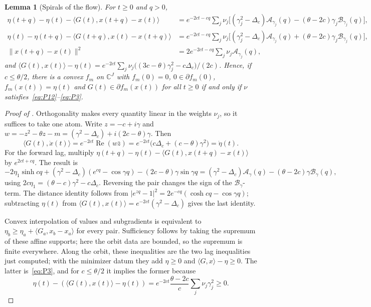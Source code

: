 \documentclass[11pt]{article}
\newtheorem{lemma}[theorem]{Lemma}
\theoremstyle{definition}
\theoremstyle{remark}
\newcommand{\C}{\mathbb C}
\newcommand{\cA}{\mathcal A}
\newcommand{\cB}{\mathcal B}
\newcommand{\ch}{\cosh}
\newcommand{\sh}{\sinh}
\newcommand{\Rea}{\operatorname{Re}}
\newcommand{\ip}[2]{\langle #1,#2\rangle}
\newcommand{\norm}[1]{\lVert #1\rVert}
\begin{document}
\begin{lemma}[Spirals of the flow]\label{lem:creduce}
For \(t\ge0\) and \(q>0\),
\begin{align*}
\eta(t+q)-\eta(t)-\ip{G(t)}{x(t+q)-x(t)}&=e^{-2ct-cq}\textstyle\sum_j\nu_j\bigl[(\gamma_j^2-\Delta_c)\cA_{\gamma_j}(q)-(\theta-2c)\gamma_j\cB_{\gamma_j}(q)\bigr],\\
\eta(t)-\eta(t+q)-\ip{G(t+q)}{x(t)-x(t+q)}&=e^{-2ct-cq}\textstyle\sum_j\nu_j\bigl[(\gamma_j^2-\Delta_c)\cA_{\gamma_j}(q)+(\theta-2c)\gamma_j\cB_{\gamma_j}(q)\bigr],\\
\norm{x(t+q)-x(t)}^2&=2e^{-2ct-cq}\textstyle\sum_j\nu_j\cA_{\gamma_j}(q),
\end{align*}
and \(\ip{G(t)}{x(t)}-\eta(t)=e^{-2ct}\sum_j\nu_j\bigl((3c-\theta)\gamma_j^2-c\Delta_c\bigr)/(2c)\).  Hence, if
\(c\le\theta/2\), there is a convex \(f_m\) on \(\C^J\) with \(f_m(0)=0\), \(0\in\partial f_m(0)\), \(f_m(x(t))=\eta(t)\) and
\(G(t)\in\partial f_m(x(t))\) for all \(t\ge0\) if and only if \(\nu\) satisfies~\eqref{eq:P12}--\eqref{eq:P3}.
\end{lemma}

\begin{proof}[Proof of ]
Orthogonality makes every quantity linear in the weights \(\nu_j\),
so it suffices to take one atom.  Write
\(z=-c+i\gamma\) and
\(w=-z^2-\theta z-m=(\gamma^2-\Delta_c)+i(2c-\theta)\gamma\).
Then
\[
\ip{G(t)}{\dot x(t)}
=e^{-2ct}\Rea(w\bar z)
=e^{-2ct}\bigl(c\Delta_c+(c-\theta)\gamma^2\bigr)=\dot\eta(t).
\]
For the forward lag, multiply
\(\eta(t+q)-\eta(t)-\ip{G(t)}{x(t+q)-x(t)}\)
by \(e^{2ct+cq}\).  The result is
\[
-2\eta_1\sh cq+(\gamma^2-\Delta_c)(e^{cq}-\cos\gamma q)
-(2c-\theta)\gamma\sin\gamma q
=(\gamma^2-\Delta_c)\cA_\gamma(q)
-(\theta-2c)\gamma\cB_\gamma(q),
\]
using \(2c\eta_1=(\theta-c)\gamma^2-c\Delta_c\).
Reversing the pair changes the sign of the \(\cB_\gamma\)-term.
The distance identity follows from
\(|e^{zq}-1|^2=2e^{-cq}(\ch cq-\cos\gamma q)\);
subtracting \(\eta(t)\) from
\(\ip{G(t)}{x(t)}=e^{-2ct}(\gamma^2-\Delta_c)\)
gives the last identity.

Convex interpolation of values and subgradients is equivalent to
\(\eta_b\ge\eta_a+\ip{G_a}{x_b-x_a}\) for every pair.
Sufficiency follows by taking the supremum of these affine supports;
here the orbit data are bounded, so the supremum is finite everywhere.
Along the orbit, these inequalities are the two lag inequalities just
computed; with the minimizer datum they add
\(\eta\ge0\) and \(\ip Gx-\eta\ge0\).
The latter is~\eqref{eq:P3}, and for \(c\le\theta/2\) it implies
the former because
\[
\eta(t)-(\ip{G(t)}{x(t)}-\eta(t))
=e^{-2ct}\frac{\theta-2c}{c}\sum_j\nu_j\gamma_j^2\ge0.
\]
\end{proof}
\end{document}
